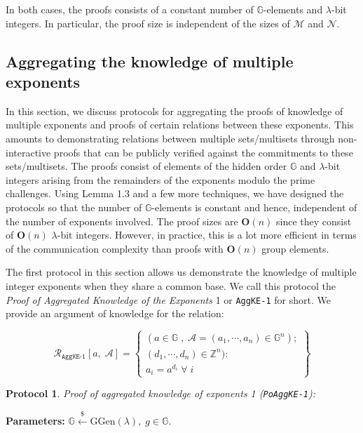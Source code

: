 \documentclass[11pt, lettersize, notitlepage, leqno, footskip=0.6cm]{article}
\newcommand{\bz}{\mathbb Z}
\newcommand{\ttt}{\texttt}
\newcommand{\mc}{\mathcal}
\newcommand{\mb}{\mathbb}
\newcommand{\mbf}{\mathbf}
\newcommand{\mr}{\mathrm}
\newcommand{\lam}{\lambda}
\newcommand{\lamb}{\lambda}
\newcommand{\bO}{\mbf{O}}
\newcommand{\mcM}{\mc{M}}
\newcommand{\noin}{\noindent}
\newtheorem{Prot}[Thm]{Protocol}
\numberwithin{equation}{section}
\begin{document}
\noin In both cases, the proofs consists of a constant number of $\mb{G}$-elements and $\lam$-bit integers. In particular, the proof size is independent of the sizes of $\mcM$ and $\mc{N}$.




\subsection{\fontsize{11}{11}\selectfont Aggregating the knowledge of multiple exponents}

In this section, we discuss protocols for aggregating the proofs of knowledge of multiple exponents and proofs of certain relations between these exponents. This amounts to demonstrating relations between multiple sets/multisets through non-interactive proofs that can be publicly verified against the commitments to these sets/multisets. The proofs consist of elements of the hidden order $\mb{G}$ and $\lam$-bit integers arising from the remainders of the exponents modulo the prime challenges. Using Lemma 1.3 and a few more techniques, we have designed the protocols so that the number of $\mb{G}$-elements is constant and hence, independent of the number of exponents involved. The proof sizes are $\bO(n)$ since they consist of $\bO(n)$ $\lam$-bit integers. However, in practice, this is a lot more efficient in terms of the communication complexity than proofs with $\bO(n)$ group elements.

The first protocol in this section allows us demonstrate the knowledge of multiple integer exponents when they share a common base. We call this protocol the \textit{Proof of Aggregated Knowledge of the Exponents} 1 or \verb|AggKE-1| for short. We provide an argument of knowledge for the relation:

\[
  \mc{R}_{{\ttt{AggKE-1}}}[a,\; \mc{A}] = \left\{\begin{array}{l}
    (a\in\mb{G}\;,\; \mc{A} = (a_1,\cdots, a_n)\in\mb{G}^n);\\ 
    (d_1,\cdots,d_n)\in\bz^n):  \\
    a_i = a^{d_i}\;\forall\; i
  \end{array}\right\}
\]



\begin{Prot} \normalfont \textit{Proof of aggregated knowledge of exponents} 1 (\verb|PoAggKE-1|):\end{Prot} \vspace{-0.3cm}

\noindent \textbf{Parameters:} $\mb{G}\xleftarrow{\$} \mr{GGen}(\lamb), \; g\in \mb{G}$.
\end{document}
